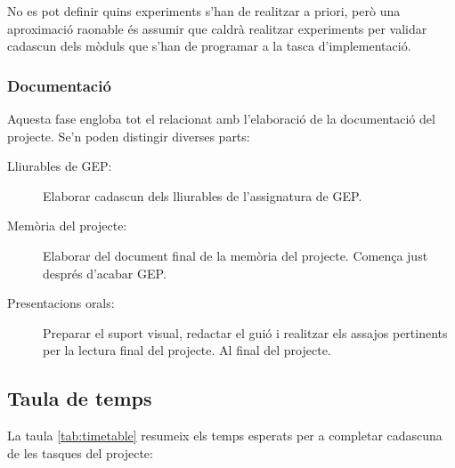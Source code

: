 \documentclass[10pt,a4paper]{article}
\begin{document}
No es pot definir quins experiments s'han de realitzar a priori, però una aproximació raonable és assumir que caldrà realitzar experiments per validar cadascun dels mòduls que s'han de programar a la tasca d'implementació. 

\subsubsection{Documentació}

Aquesta fase engloba tot el relacionat amb l'elaboració de la documentació del projecte. Se'n poden distingir diverses parts:

\begin{description}
    \item[Lliurables de GEP:]{Elaborar cadascun dels lliurables de l'assignatura de GEP.}
    \item[Memòria del projecte:]{Elaborar del document final de la memòria del projecte. Comença just després d'acabar GEP.}
    \item[Presentacions orals:]{Preparar el suport visual, redactar el guió i realitzar els assajos pertinents per la lectura final del projecte. Al final del projecte.}
\end{description}


\subsection{Taula de temps}

La taula \ref{tab:timetable} resumeix els temps esperats per a completar cadascuna de les tasques del projecte:
\end{document}
